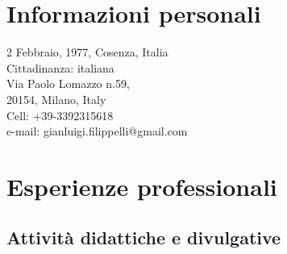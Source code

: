 \section{Informazioni personali}

\begin{flushleft}
	2 Febbraio, 1977, Cosenza, Italia\\
	Cittadinanza: italiana\\
	Via Paolo Lomazzo n.59,\\
	20154, Milano, Italy\\ 
	Cell: +39-3392315618\\
	e-mail: gianluigi.filippelli@gmail.com\\
\end{flushleft}

\section{Esperienze professionali}
\subsection*{Attività didattiche e divulgative}

